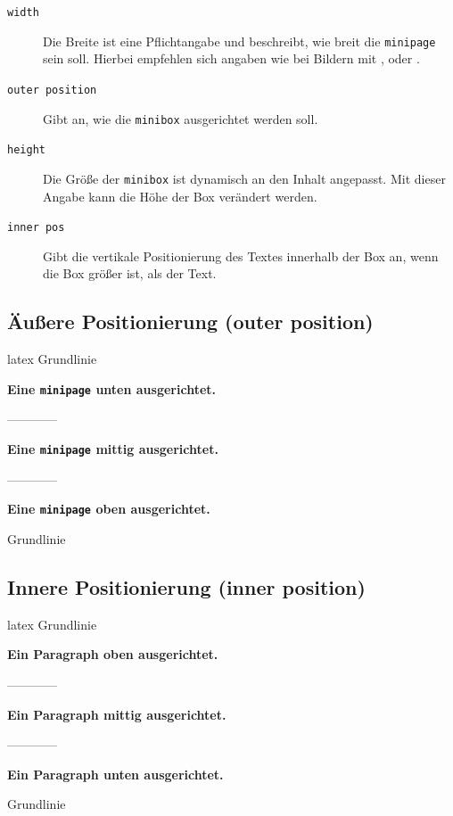 \begin{description}
    \item[\texttt{width}] Die Breite ist eine Pflichtangabe und beschreibt, wie breit die \texttt{minipage} sein soll. Hierbei empfehlen sich angaben wie bei Bildern mit \texttt{\columnwidth}, \texttt{\textwidth} oder \texttt{\linewidth}.
    \item[\texttt{outer position}] Gibt an, wie die \texttt{minibox} ausgerichtet werden soll.
    \item[\texttt{height}] Die Größe der \texttt{minibox} ist dynamisch an den Inhalt angepasst. Mit dieser Angabe kann die Höhe der Box verändert werden.
    \item[\texttt{inner pos}] Gibt die vertikale Positionierung des Textes innerhalb der Box an, wenn die Box größer ist, als der Text.
\end{description}

\subsection{Äußere Positionierung (outer position)}
\begin{showcode}{latex}
    Grundlinie
    \begin{minipage}[b]{0.17\linewidth}
        \textbf{Eine \texttt{minipage} unten ausgerichtet.}
    \end{minipage}
    ------------
    \begin{minipage}{0.17\linewidth}
        \textbf{Eine \texttt{minipage} mittig ausgerichtet.}
    \end{minipage}
    ------------
    \begin{minipage}[t]{0.17\linewidth}
        \textbf{Eine \texttt{minipage} oben ausgerichtet.}
    \end{minipage}
    Grundlinie
\end{showcode}

\subsection{Innere Positionierung (inner position)}
\begin{showcode}{latex}
    Grundlinie
    \begin{minipage}[b][3cm][t]{0.17\linewidth}
        \textbf{Ein Paragraph oben ausgerichtet.}
    \end{minipage}
    ------------
    \begin{minipage}[b][3cm][c]{0.17\linewidth}
        \textbf{Ein Paragraph mittig ausgerichtet.}
    \end{minipage}
    ------------
    \begin{minipage}[b][3cm][b]{0.17\linewidth}
        \textbf{Ein Paragraph unten ausgerichtet.}
    \end{minipage}
    Grundlinie
\end{showcode}